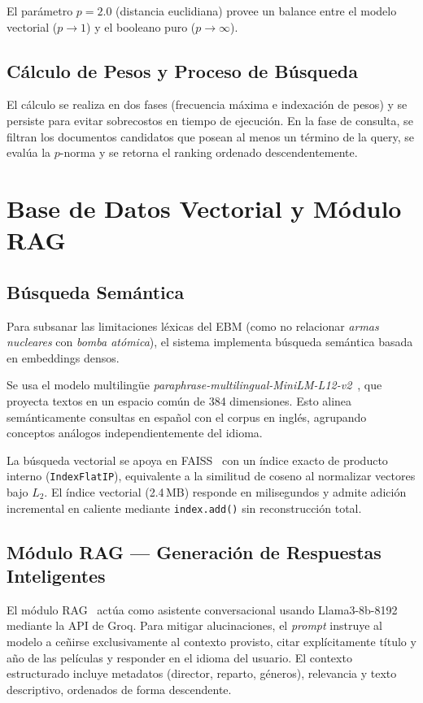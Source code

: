 \documentclass[10pt,a4paper]{llncs}
\begin{document}
El parámetro $p=2.0$ (distancia euclidiana) provee un balance entre el modelo vectorial ($p \to 1$) y el booleano puro ($p \to \infty$).

\subsection{Cálculo de Pesos y Proceso de Búsqueda}

El cálculo se realiza en dos fases (frecuencia máxima e indexación de pesos) y se persiste para evitar sobrecostos en tiempo de ejecución. En la fase de consulta, se filtran los documentos candidatos que posean al menos un término de la query, se evalúa la $p$-norma y se retorna el ranking ordenado descendentemente.

\section{Base de Datos Vectorial y Módulo RAG}

\subsection{Búsqueda Semántica}

Para subsanar las limitaciones léxicas del EBM (como no relacionar \textit{armas nucleares} con \textit{bomba atómica}), el sistema implementa búsqueda semántica basada en embeddings densos.

Se usa el modelo multilingüe \textit{paraphrase-multilingual-MiniLM-L12-v2}~\cite{reimers2019sentence}, que proyecta textos en un espacio común de 384 dimensiones. Esto alinea semánticamente consultas en español con el corpus en inglés, agrupando conceptos análogos independientemente del idioma.

La búsqueda vectorial se apoya en FAISS~\cite{johnson2019billion} con un índice exacto de producto interno (\texttt{IndexFlatIP}), equivalente a la similitud de coseno al normalizar vectores bajo $L_2$. El índice vectorial (2.4\,MB) responde en milisegundos y admite adición incremental en caliente mediante \texttt{index.add()} sin reconstrucción total.

\subsection{Módulo RAG --- Generación de Respuestas Inteligentes}

El módulo RAG~\cite{lewis2020retrieval} actúa como asistente conversacional usando Llama3-8b-8192 mediante la API de Groq. Para mitigar alucinaciones, el \textit{prompt} instruye al modelo a ceñirse exclusivamente al contexto provisto, citar explícitamente título y año de las películas y responder en el idioma del usuario. El contexto estructurado incluye metadatos (director, reparto, géneros), relevancia y texto descriptivo, ordenados de forma descendente.
\end{document}
